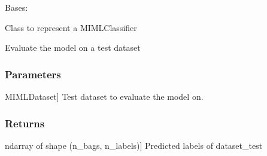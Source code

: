 \documentclass[letterpaper,10pt,english]{sphinxmanual}
\begin{document}
\begin{fulllineitems}
\label{\detokenize{classifier/_autosummary/miml.classifier.miml_classifier.MIMLClassifier:miml.classifier.miml_classifier.MIMLClassifier}}
\pysigstartsignatures
{}
\pysigstopsignatures
\sphinxAtStartPar
Bases: 

\sphinxAtStartPar
Class to represent a MIMLClassifier

\begin{fulllineitems}
\label{\detokenize{classifier/_autosummary/miml.classifier.miml_classifier.MIMLClassifier:miml.classifier.miml_classifier.MIMLClassifier.evaluate}}
\pysigstartsignatures
{}
\pysigstopsignatures
\sphinxAtStartPar
Evaluate the model on a test dataset


\subsubsection{Parameters}
\label{\detokenize{classifier/_autosummary/miml.classifier.miml_classifier.MIMLClassifier:parameters}}\begin{description}
\sphinxlineitem{dataset\_test}{[}MIMLDataset{]}
\sphinxAtStartPar
Test dataset to evaluate the model on.

\end{description}


\subsubsection{Returns}
\label{\detokenize{classifier/_autosummary/miml.classifier.miml_classifier.MIMLClassifier:returns}}\begin{description}
\sphinxlineitem{results}{[}ndarray of shape (n\_bags, n\_labels){]}
\sphinxAtStartPar
Predicted labels of dataset\_test


\end{description}
\end{fulllineitems}
\end{fulllineitems}
\end{document}
